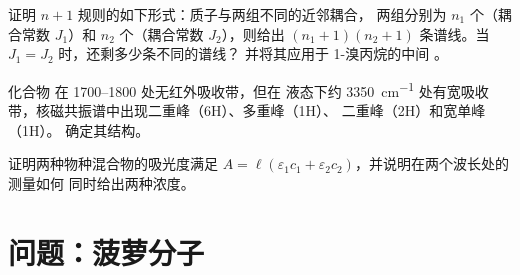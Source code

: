 \begin{exercise}[$\star\star\star$]\label{exo:b1:structure-spectroscopy:10}
证明 $n + 1$ 规则的如下形式：质子与两组不同的近邻耦合，
两组分别为 $n_1$ 个（耦合常数 $J_1$）和 $n_2$ 个（耦合常数 $J_2$），则给出 $(n_1 +
1)(n_2 + 1)$ 条谱线。当 $J_1 = J_2$ 时，还剩多少条不同的谱线？
并将其应用于 1-溴丙烷的中间 。
\end{exercise}

\begin{exercise}[$\star\star\star$]\label{exo:b1:structure-spectroscopy:11}
化合物  在 1700--1800 处无红外吸收带，但在
液态下约 \qty{3350}{cm^{-1}} 处有宽吸收带，核磁共振谱中出现二重峰（6H）、多重峰（1H）、
二重峰（2H）和宽单峰（1H）。
确定其结构。
\end{exercise}

\begin{exercise}[$\star\star\star$]\label{exo:b1:structure-spectroscopy:12}
证明两种物种混合物的吸光度满足 $A = \ell(\varepsilon_1c_1
+ \varepsilon_2c_2)$，并说明在两个波长处的测量如何
同时给出两种浓度。
\end{exercise}

\section{问题：菠萝分子}

